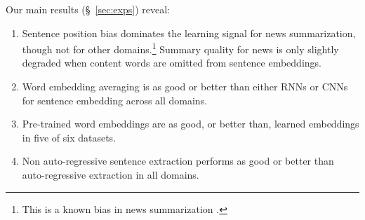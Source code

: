 \noindent
Our main results (\S~\ref{sec:exps}) reveal:
\begin{enumerate}[noitemsep]
\item Sentence position bias dominates the learning signal for news summarization, though not for
    other domains.\footnote{This is a known bias 
    in news summarization \cite{nenkova2005automatic}.}
Summary quality for news is only slightly degraded when content words
are omitted from sentence embeddings. %
\item Word embedding averaging is as good or better than either RNNs or CNNs for sentence embedding across all domains.
\item Pre-trained word embeddings are as good, or better than, learned embeddings in five of six datasets.%
\item Non auto-regressive sentence extraction performs as good or better 
     than auto-regressive extraction in all
    domains.
\end{enumerate} 

%
%

